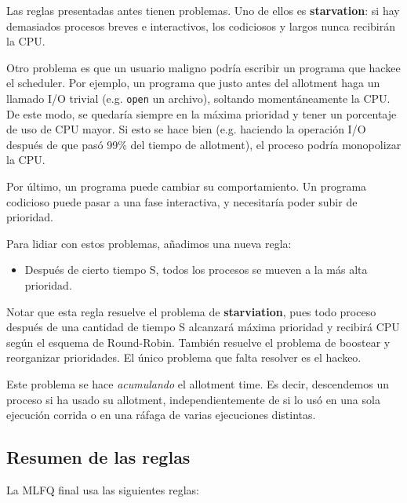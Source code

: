 \documentclass[12pt]{article}
\theoremstyle{definition}
\begin{document}
Las reglas presentadas antes tienen problemas. Uno de ellos es
\textbf{starvation}: si hay demasiados procesos breves e interactivos, los
codiciosos y largos nunca recibirán la CPU.

Otro problema es que un usuario maligno podría escribir un programa que hackee
el scheduler. Por ejemplo, un programa que justo antes del allotment haga un
llamado I/O trivial (e.g. \texttt{open} un archivo), soltando momentáneamente la
CPU. De este modo, se quedaría siempre en la máxima prioridad y tener un
porcentaje de uso de CPU mayor. Si esto se hace bien (e.g. haciendo la operación
I/O después de que pasó 99\% del tiempo de allotment), el proceso podría
monopolizar la CPU.

Por último, un programa puede cambiar su comportamiento. Un programa codicioso
puede pasar a una fase interactiva, y necesitaría poder subir de prioridad.

Para lidiar con estos problemas, añadimos una nueva regla: 

\begin{itemize}
    \item Después de cierto tiempo S, todos los procesos se mueven a la más alta
        prioridad.
\end{itemize}

Notar que esta regla resuelve el problema de \textbf{starviation}, pues todo
proceso después de una cantidad de tiempo S alcanzará máxima prioridad y
recibirá CPU según el esquema de Round-Robin. También resuelve el problema de
boostear y reorganizar prioridades. El único problema que falta resolver es el
hackeo. 

Este problema se hace \textit{acumulando} el allotment time. Es decir,
descendemos un proceso si ha usado su allotment, independientemente de si lo usó
en una sola ejecución corrida o en una ráfaga de varias ejecuciones distintas. 

\subsection{Resumen de las reglas}

La MLFQ final usa las siguientes reglas: 
\end{document}
